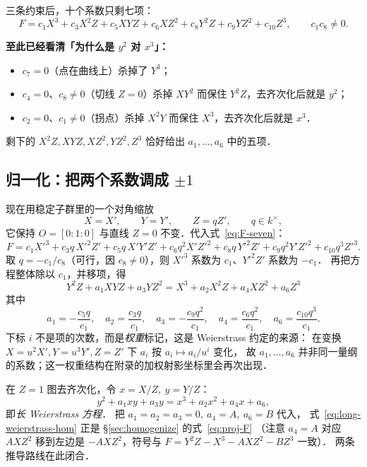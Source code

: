 \documentclass[10pt,a4paper]{article}
\numberwithin{equation}{section}
\begin{document}
三条约束后，十个系数只剩七项：
\begin{equation}\label{eq:F-seven}
F=c_{1}X^{3}+c_{3}X^{2}Z+c_{5}XYZ+c_{6}XZ^{2}+c_{8}Y^{2}Z+c_{9}YZ^{2}+c_{10}Z^{3},
\qquad c_{1}c_{8}\neq0 .
\end{equation}

\begin{framed}
\noindent\textbf{至此已经看清「为什么是 $y^{2}$ 对 $x^{3}$」：}
\begin{itemize}
\item $c_{7}=0$（点在曲线上）杀掉了 $Y^{3}$；
\item $c_{4}=0$、$c_{8}\neq0$（切线 $Z=0$）杀掉 $XY^{2}$ 而保住 $Y^{2}Z$，去齐次化后就是 $y^{2}$；
\item $c_{2}=0$、$c_{1}\neq0$（拐点）杀掉 $X^{2}Y$ 而保住 $X^{3}$，去齐次化后就是 $x^{3}$．
\end{itemize}
剩下的 $X^{2}Z,XYZ,XZ^{2},YZ^{2},Z^{3}$ 恰好给出 $a_{1},\dots,a_{6}$ 中的五项．
\end{framed}

\subsection{归一化：把两个系数调成 $\pm1$}

现在用稳定子群里的一个对角缩放
\[
X=X',\qquad Y=Y',\qquad Z=qZ',\qquad q\in k^{\times},
\]
它保持 $O=[0:1:0]$ 与直线 $Z=0$ 不变．代入式~\eqref{eq:F-seven}：
\begin{equation}\label{eq:F-q}
F=c_{1}X'^{3}+c_{3}q\,X'^{2}Z'+c_{5}q\,X'Y'Z'+c_{6}q^{2}X'Z'^{2}
  +c_{8}q\,Y'^{2}Z'+c_{9}q^{2}Y'Z'^{2}+c_{10}q^{3}Z'^{3}.
\end{equation}
取 $q=-c_{1}/c_{8}$（可行，因 $c_{8}\neq0$），则 $X'^{3}$ 系数为 $c_{1}$、$Y'^{2}Z'$ 系数为 $-c_{1}$．
再把方程整体除以 $c_{1}$，并移项，得
\begin{equation}\label{eq:long-weierstrass-hom}
\boxed{\;Y^{2}Z+a_{1}XYZ+a_{3}YZ^{2}=X^{3}+a_{2}X^{2}Z+a_{4}XZ^{2}+a_{6}Z^{3}\;}
\end{equation}
其中
\[
a_{1}=-\frac{c_{5}q}{c_{1}},\quad
a_{2}=\frac{c_{3}q}{c_{1}},\quad
a_{3}=-\frac{c_{9}q^{2}}{c_{1}},\quad
a_{4}=\frac{c_{6}q^{2}}{c_{1}},\quad
a_{6}=\frac{c_{10}q^{3}}{c_{1}} .
\]
下标 $i$ 不是项的次数，而是\emph{权重}标记，这是 Weierstrass 约定的来源：
在变换 $X=u^{2}X',Y=u^{3}Y',Z=Z'$ 下 $a_{i}$ 按 $a_{i}\mapsto a_{i}/u^{i}$ 变化，
故 $a_{1},\dots,a_{6}$ 并非同一量纲的系数；这一权重结构在附录的加权射影坐标里会再次出现．

在 $Z=1$ 图去齐次化，令 $x=X/Z,\ y=Y/Z$：
\begin{equation}\label{eq:long-weierstrass}
y^{2}+a_{1}xy+a_{3}y=x^{3}+a_{2}x^{2}+a_{4}x+a_{6},
\end{equation}
即\emph{长 Weierstrass 方程}．
把 $a_{1}=a_{2}=a_{3}=0,\ a_{4}=A,\ a_{6}=B$ 代入，
式~\eqref{eq:long-weierstrass-hom} 正是 \S\ref{sec:homogenize} 的式~\eqref{eq:proj-F}
（注意 $a_{4}=A$ 对应 $AXZ^{2}$ 移到左边是 $-AXZ^{2}$，符号与 $F=Y^{2}Z-X^{3}-AXZ^{2}-BZ^{3}$ 一致）．
两条推导路线在此闭合．
\end{document}
